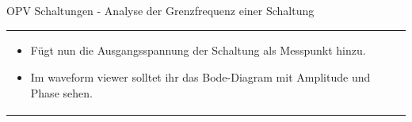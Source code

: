 \begin{frame}[t]{OPV Schaltungen - Analyse der Grenzfrequenz einer Schaltung }
\begin{spacing}{0.9}
\begin{tiny}
\begin{table}[h!]
\begin{tabular}{p{6cm} p{4cm}}
\begin{minipage}{.4\textwidth}
\begin{itemize}
              \item Fügt nun die Ausgangsspannung der Schaltung als Messpunkt hinzu.
              \item Im waveform viewer solltet ihr das Bode-Diagram mit Amplitude und Phase sehen.
            \end{itemize}
          \end{minipage}
          \\
        \end{tabular}

      \end{table}

    \end{tiny} \end{spacing}



\end{frame}

